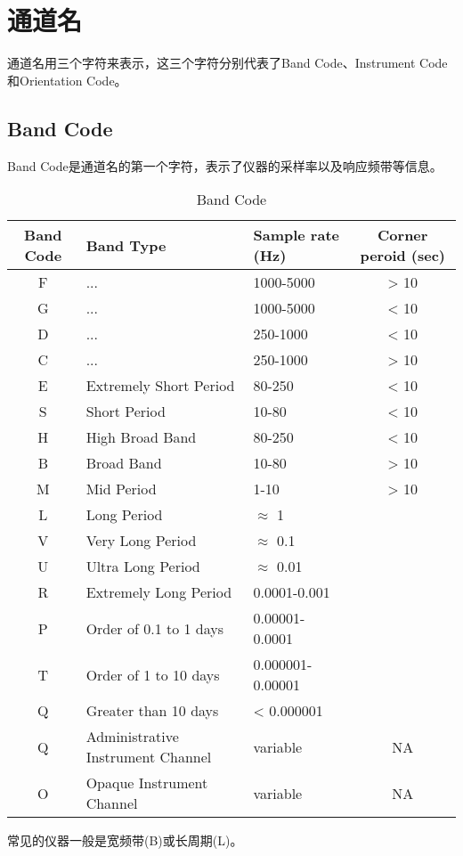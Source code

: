 \section{通道名}
通道名用三个字符来表示，这三个字符分别代表了Band Code、Instrument Code和Orientation Code。

\subsection{Band Code}
Band Code是通道名的第一个字符，表示了仪器的采样率以及响应频带等信息。

\begin{table}[H]
\centering\small
\caption{Band Code}
\label{tbl:bandcode}
\begin{tabular}{cllc}
\toprule
Band Code   &   Band Type   &   Sample rate (Hz)    & Corner peroid (sec)   \\
\midrule
F           &   ...         &   1000-5000   &     > 10    \\
G           &   ...         &   1000-5000   &     < 10    \\
D           &   ...         &   250-1000    &     < 10    \\
C           &   ...         &   250-1000    &     > 10    \\
E           &   Extremely Short Period  & 80-250    &     < 10    \\
S           &   Short Period          & 10-80   & < 10    \\
H           &   High Broad Band         &   80-250    &   < 10    \\
B           &   Broad Band          &   10-80   & > 10    \\
M           &   Mid Period          &   1-10   & > 10    \\
L           &   Long Period         &   $\approx$ 1   &   \\
V           &   Very  Long Period         & $\approx$ 0.1   &   \\
U           &   Ultra Long Period         & $\approx$ 0.01    &   \\
R           &   Extremely Long Period     & 0.0001-0.001    &   \\
P           &   Order of 0.1 to 1 days   & 0.00001-0.0001    &   \\
T           &   Order of 1 to 10 days    & 0.000001-0.00001    &   \\
Q           &   Greater than 10 days          &     < 0.000001    &   \\
Q           &   Administrative Instrument Channel   & variable    & NA    \\
O           &   Opaque Instrument Channel         & variable    &   NA    \\
\bottomrule
\end{tabular}
\end{table}
常见的仪器一般是宽频带(B)或长周期(L)。

